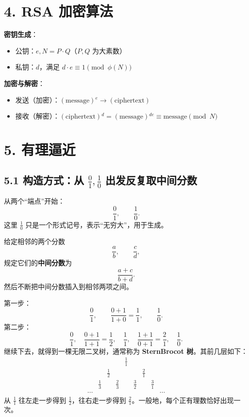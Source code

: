 \documentclass[12pt, a4paper]{article}
\begin{document}
\section*{4. RSA 加密算法}

\begin{mdframed}
    \textbf{密钥生成}：
    \begin{itemize}
        \item 公钥：\(e, N = P \cdot Q\)（\(P, Q\) 为大素数）
        \item 私钥：\(d\)，满足 \(d \cdot e \equiv 1 \pmod{\phi(N)}\)
    \end{itemize}
    \textbf{加密与解密}：
    \begin{itemize}
        \item 发送（加密）：\((\text{message}){}^e \to (\text{ciphertext})\)
        \item 接收（解密）：\((\text{ciphertext}){}^d = (\text{message}){}^{de} \equiv \text{message} \pmod N\)
    \end{itemize}
\end{mdframed}

\section*{5. 有理逼近}

\subsection*{5.1 构造方式：从 \(\frac01,\frac10\) 出发反复取中间分数}

从两个“端点”开始：
\[
\frac{0}{1},\qquad \frac{1}{0}.
\]
这里 \(\frac10\) 只是一个形式记号，表示“无穷大”，用于生成。

给定相邻的两个分数
\[
\frac{a}{b},\qquad \frac{c}{d},
\]
规定它们的\textbf{中间分数}为
\[
\frac{a+c}{b+d}.
\]
然后不断把中间分数插入到相邻两项之间。

第一步：
\[
\frac{0}{1},\qquad \frac{0+1}{1+0}=\frac11,\qquad \frac{1}{0}.
\]
第二步：
\[
\frac{0}{1},\quad
\frac{0+1}{1+1}=\frac12,\quad
\frac11,\quad
\frac{1+1}{0+1}=\frac21,\quad
\frac10.
\]
继续下去，就得到一棵无限二叉树，通常称为 \textbf{Stern\textendash{}Brocot 树}。其前几层如下：
\[
\begin{array}{ccccccccc}
 & & & & \frac11 & & & & \\
 & & \frac12 & & & & \frac21 & & \\
 & \frac13 & & \frac23 & & \frac32 & & \frac31 & \\
\cdots & & & & & & & & \cdots
\end{array}
\]
从 \(\frac11\) 往左走一步得到 \(\frac12\)，往右走一步得到 \(\frac21\)。一般地，每个正有理数恰好出现一次。
\end{document}
